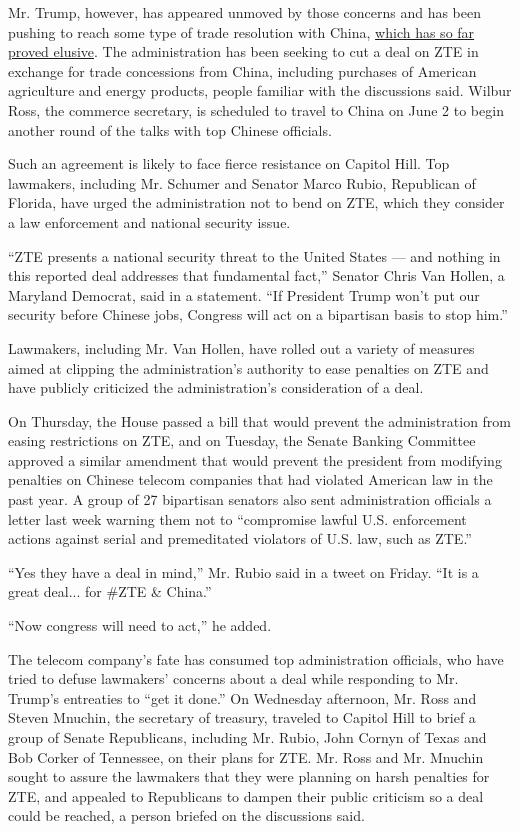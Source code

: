 Mr. Trump, however, has appeared unmoved by those concerns and has been
pushing to reach some type of trade resolution with China,
\href{https://www.nytimes.com/2018/05/21/us/politics/trump-trade-china.html}{which
has so far proved elusive}. The administration has been seeking to cut a
deal on ZTE in exchange for trade concessions from China, including
purchases of American agriculture and energy products, people familiar
with the discussions said. Wilbur Ross, the commerce secretary, is
scheduled to travel to China on June 2 to begin another round of the
talks with top Chinese officials.

Such an agreement is likely to face fierce resistance on Capitol Hill.
Top lawmakers, including Mr. Schumer and Senator Marco Rubio, Republican
of Florida, have urged the administration not to bend on ZTE, which they
consider a law enforcement and national security issue.

``ZTE presents a national security threat to the United States --- and
nothing in this reported deal addresses that fundamental fact,'' Senator
Chris Van Hollen, a Maryland Democrat, said in a statement. ``If
President Trump won't put our security before Chinese jobs, Congress
will act on a bipartisan basis to stop him.''

Lawmakers, including Mr. Van Hollen, have rolled out a variety of
measures aimed at clipping the administration's authority to ease
penalties on ZTE and have publicly criticized the administration's
consideration of a deal.

On Thursday, the House passed a bill that would prevent the
administration from easing restrictions on ZTE, and on Tuesday, the
Senate Banking Committee approved a similar amendment that would prevent
the president from modifying penalties on Chinese telecom companies that
had violated American law in the past year. A group of 27 bipartisan
senators also sent administration officials a letter last week warning
them not to ``compromise lawful U.S. enforcement actions against serial
and premeditated violators of U.S. law, such as ZTE.''

``Yes they have a deal in mind,'' Mr. Rubio said in a tweet on Friday.
``It is a great deal... for \#ZTE \& China.''

``Now congress will need to act,'' he added.

The telecom company's fate has consumed top administration officials,
who have tried to defuse lawmakers' concerns about a deal while
responding to Mr. Trump's entreaties to ``get it done.'' On Wednesday
afternoon, Mr. Ross and Steven Mnuchin, the secretary of treasury,
traveled to Capitol Hill to brief a group of Senate Republicans,
including Mr. Rubio, John Cornyn of Texas and Bob Corker of Tennessee,
on their plans for ZTE. Mr. Ross and Mr. Mnuchin sought to assure the
lawmakers that they were planning on harsh penalties for ZTE, and
appealed to Republicans to dampen their public criticism so a deal could
be reached, a person briefed on the discussions said.

